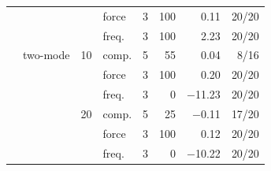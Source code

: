 \begin{tabular}{l l r l r r r r}
 &  &  & force & 3 & 100 & 0.11 & 20/20 \\
 &  &  & freq. & 3 & 100 & 2.23 & 20/20 \\
 & two-mode & 10 & comp. & 5 & 55 & 0.04 & 8/16 \\
 &  &  & force & 3 & 100 & 0.20 & 20/20 \\
 &  &  & freq. & 3 & 0 & $-$11.23 & 20/20 \\
 &  & 20 & comp. & 5 & 25 & $-$0.11 & 17/20 \\
 &  &  & force & 3 & 100 & 0.12 & 20/20 \\
 &  &  & freq. & 3 & 0 & $-$10.22 & 20/20 \\
\bottomrule
\end{tabular}
